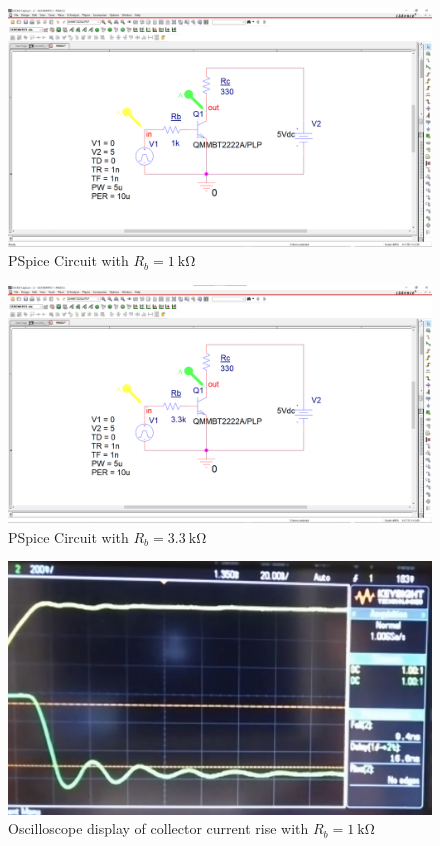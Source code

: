 \documentclass{article}
\begin{document}
\begin{figure}[H]
  \centering
  \includegraphics[width=\textwidth]{ECE2200L_Lab11_PSpice_ckt_1k.png}
  \caption{PSpice Circuit with $R_b = \SI{1}{\kilo\ohm}$}
  \label{fig:ckt1k}
\end{figure}
\begin{figure}[H]
  \centering
  \includegraphics[width=\textwidth]{ECE2200L_Lab11_PSpice_ckt_3_3k.png}
  \caption{PSpice Circuit with $R_b = \SI{3.3}{\kilo\ohm}$}
  \label{fig:ckt3k3}
\end{figure}
\begin{figure}[H]
  \centering
  \includegraphics[width=\textwidth]{ECE2200L_1k_rise.png}
  \caption{Oscilloscope display of collector current rise with $R_b = \SI{1}{\kilo\ohm}$}
  \label{fig:scope1krise}
\end{figure}
\end{document}

